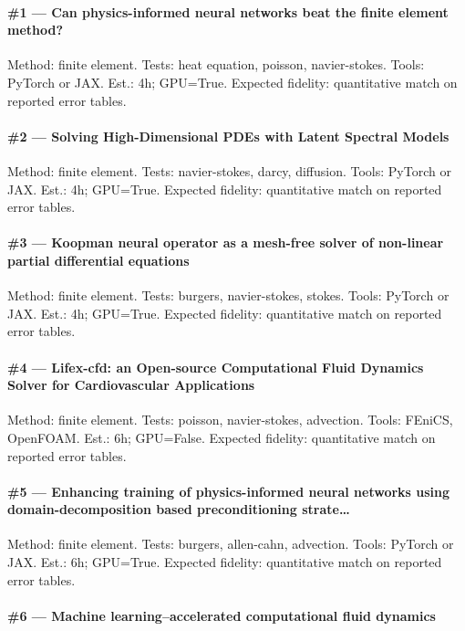 \documentclass[10pt,letterpaper]{article}
\begin{document}
\paragraph{\#1 — Can physics-informed neural networks beat the finite element method?}

Method: finite element. Tests: heat equation, poisson, navier-stokes. Tools: PyTorch or JAX. Est.: 4h; GPU=True. Expected fidelity: quantitative match on reported error tables. 

\paragraph{\#2 — Solving High-Dimensional PDEs with Latent Spectral Models}

Method: finite element. Tests: navier-stokes, darcy, diffusion. Tools: PyTorch or JAX. Est.: 4h; GPU=True. Expected fidelity: quantitative match on reported error tables. 

\paragraph{\#3 — Koopman neural operator as a mesh-free solver of non-linear partial differential equations}

Method: finite element. Tests: burgers, navier-stokes, stokes. Tools: PyTorch or JAX. Est.: 4h; GPU=True. Expected fidelity: quantitative match on reported error tables. 

\paragraph{\#4 — Lifex-cfd: an Open-source Computational Fluid Dynamics Solver for Cardiovascular Applications}

Method: finite element. Tests: poisson, navier-stokes, advection. Tools: FEniCS, OpenFOAM. Est.: 6h; GPU=False. Expected fidelity: quantitative match on reported error tables. 

\paragraph{\#5 — Enhancing training of physics-informed neural networks using domain-decomposition based preconditioning strate…}

Method: finite element. Tests: burgers, allen-cahn, advection. Tools: PyTorch or JAX. Est.: 6h; GPU=True. Expected fidelity: quantitative match on reported error tables. 

\paragraph{\#6 — Machine learning–accelerated computational fluid dynamics}
\end{document}
